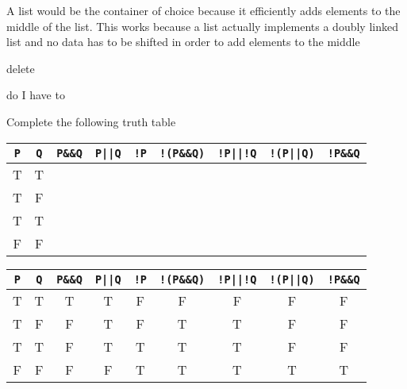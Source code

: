 \documentclass[10pt,answers,addpoints]{exam}
\begin{document}
\begin{questions}
\begin{minipage}{\linewidth}
\begin{solutionbox}{3in}

A list would be the container of choice because it efficiently adds elements
to the middle of the list. This works because a list actually implements a
doubly linked list and no data has to be shifted in order to add elements to
the middle

\end{solutionbox}
\end{minipage}


\par\vspace{0.100000in}\begin{minipage}{\linewidth}
\question[20]
delete
\begin{solutionbox}{3in}
do I have to
\end{solutionbox}
\end{minipage}


\par\vspace{0.100000in}\begin{minipage}{\linewidth}
\question[14]

Complete the following truth table
\begin{center}
\begin{tabular}{ | c | c | c | c | c | c | c | c | c |}
\hline

\verb#P#&\verb#Q#&\verb#P&&Q#&\verb#P||Q#&\verb#!P#&
\verb#!(P&&Q)#&\verb#!P||!Q#&\verb#!(P||Q)#&\verb#!P&&Q# \\ \hline
T&T& & & & & & &  \\ \hline
T&F& & & & & & &  \\ \hline
T&T& & & & & & &  \\ \hline
F&F& & & & & & &  \\ \hline
\end{tabular}
\end{center}

\begin{solutionbox}{0in}

\begin{center}
\begin{tabular}{ | c | c | c | c | c | c | c | c | c |}
\hline
\verb#P#&\verb#Q#&\verb#P&&Q#&\verb#P||Q#&\verb#!P#&
\verb#!(P&&Q)#&\verb#!P||!Q#&\verb#!(P||Q)#&\verb#!P&&Q# \\ \hline
T&T&T&T&F&F&F&F&F \\ \hline
T&F&F&T&F&T&T&F&F \\ \hline
T&T&F&T&T&T&T&F&F \\ \hline
F&F&F&F&T&T&T&T&T \\ \hline
\end{tabular}
\end{center}


\end{solutionbox}
\end{minipage}
\end{questions}
\end{document}
